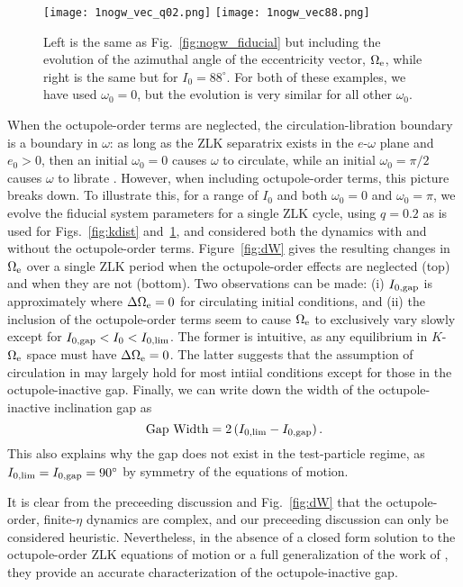 \documentclass[
        fleqn,
        usenatbib,
    ]{mnras}
\newcommand*{\p}[1]{\left(#1\right)}
\newlength{\colummwidth}
\begin{document}
\begin{figure}
    \centering
    \texttt{[image: 1nogw\_vec\_q02.png]}
    \texttt{[image: 1nogw\_vec88.png]}
    \caption{Left is the same as Fig.~\ref{fig:nogw_fiducial} but including the
    evolution of the azimuthal angle of the eccentricity vector, $\Omega_{\rm
    e}$, while right is the same but for $I_0 = 88^\circ$. For both of
    these examples, we have used $\omega_0 = 0$, but the evolution is very
    similar for all other $\omega_0$.}\label{fig:nogw_circ}
\end{figure}

When the octupole-order terms are neglected, the circulation-libration
boundary is a boundary in $\omega$: as long as the ZLK separatrix exists in the
$e$-$\omega$ plane and $e_0 > 0$, then an initial $\omega_0 = 0$ causes $\omega$
to circulate, while an initial $\omega_0 = \pi/2$ causes $\omega$ to librate
\citep[e.g.][]{kinoshita, shevchenko2016lidov}. However, when including
octupole-order terms, this picture breaks down. To illustrate this, for a range
of $I_0$ and both $\omega_0 = 0$ and $\omega_0 = \pi$, we evolve the fiducial
system parameters for a single ZLK cycle, using $q = 0.2$ as is used for
Figs.~\ref{fig:kdist} and~\ref{fig:nogw_circ}, and considered both the dynamics
with and without the octupole-order terms. Figure~\ref{fig:dW} gives the
resulting changes in $\Omega_{\rm e}$ over a single ZLK period when the
octupole-order effects are neglected (top) and when they are not (bottom).
Two observations can be made: (i) $I_{\rm 0, gap}$ is approximately where
$\Delta \Omega_{\rm e} = 0$ for circulating initial conditions, and (ii) the
inclusion of the octupole-order terms seem to cause $\Omega_{\rm e}$ to
exclusively vary slowly except for $I_{\rm 0, gap} < I_0 < I_{0, \lim}$. The
former is intuitive, as any equilibrium in $K$-$\Omega_{\rm e}$ space must have
$\Delta \Omega_{\rm e} = 0$. The latter suggests that the assumption of
circulation in \citet{katz2011long} may largely hold for most intiial conditions
except for those in the octupole-inactive gap. Finally, we can write down the
width of the octupole-inactive inclination gap as
\begin{equation}
    \text{Gap Width} = 2\p{I_{0, \lim} - I_{\rm 0, gap}}.
\end{equation}
This also explains why the gap does not exist in the test-particle regime, as
$I_{0, \lim} = I_{\rm 0, gap} = 90^\circ$ by symmetry of the equations of
motion.

It is clear from the preceeding discussion and Fig.~\ref{fig:dW} that the
octupole-order, finite-$\eta$ dynamics are complex, and our preceeding
discussion can only be considered heuristic. Nevertheless, in the absence of a
closed form solution to the octupole-order ZLK equations of motion or a full
generalization of the work of \citet{katz2011long}, they provide an accurate
characterization of the octupole-inactive gap.
\end{document}
